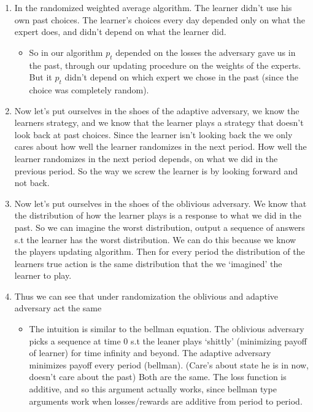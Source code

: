 \documentclass[11pt]{article}
\theoremstyle{quest}
\begin{document}
\begin{enumerate}
	\item In the randomized weighted average algorithm. The learner didn't use his own past choices. The learner's choices every day depended only on what the expert does, and didn't depend on what the learner did.
	\begin{itemize}
		\item So in our algorithm $p_t$ depended on the losses the adversary gave us in the past, through our updating procedure on the weights of the experts. But it $p_t$ didn't depend on which expert we chose in the past (since the choice was completely random).
	\end{itemize}
	\item Now let's put ourselves in the shoes of the adaptive adversary, we know the learners strategy, and we know that the learner plays a strategy that doesn't look back at past choices. Since the learner isn't looking back the we only cares about how well the learner randomizes in the next period. How well the learner randomizes in the next period depends, on what we did in the previous period. So the way we screw the learner is by looking forward and not back. 
	\item Now let's put ourselves in the shoes of the oblivious  adversary. We know that the distribution of how the learner plays is a response to what we  did in the past.  So we can imagine the worst distribution, output a sequence of answers s.t the learner has the worst distribution. We can do this because we know the players updating algorithm. Then for every period the distribution of the learners true action  is the same distribution that the we `imagined' the learner to play. 
	\item Thus we can see that under randomization the oblivious and adaptive adversary act the same
	\begin{itemize}
		\item The intuition is similar to the bellman equation. The oblivious adversary picks a sequence at time 0 s.t the leaner plays `shittly' (minimizing payoff of learner) for time infinity and beyond. The adaptive adversary minimizes payoff every period (bellman). (Care's about state he is in now, doesn't care about the past) Both are the same. The loss function is additive, and so this argument actually works, since bellman type arguments work when losses/rewards are additive from period to period.  
	\end{itemize}
\end{enumerate} 
\end{document}
